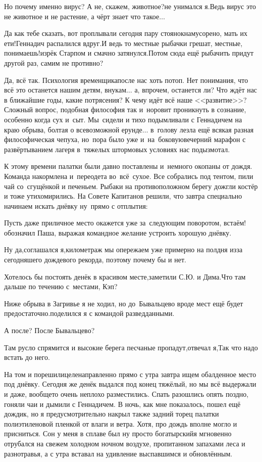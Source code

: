 \diagdash Но почему именно вирус? А не, скажем, животное?\mdash не унимался я.\mdash Ведь вирус это не животное и не растение, а чёрт знает что такое$\ldots$

\diagdash Да как тебе сказать, вот проплывали сегодня пару стоянок\mdash намусорено, мать их ети!\mdash Геннадич распалился вдруг.\mdash И ведь то местные рыбачки грешат, местные, понимаешь!\mdash изрёк Старпом и смачно затянулся.\mdash Потом сюда ещё рыбачить придут другой раз, самим не противно?

Да, всё так. Психология временщика\mdash после нас хоть потоп. Нет понимания, что всё это останется нашим детям, внукам$\ldots$ а, впрочем, останется ли? Что ждёт нас в ближайшие годы, какие потрясения? К чему идёт всё наше <<развитие>>? Сложный вопрос, подобная философия так и~норовит проникнуть в сознание, особенно когда сух и~сыт. Мы~сидели и тихо подымливали с Геннадичем на краю обрыва, болтая о всевозможной ерунде$\ldots$ в~голову лезла ещё всякая разная философическая чепуха, но~пора было уже и~на~боковую\mdash вечерний марафон с развёртыванием лагеря в~тяжелых штормовых условиях нас подызмотал.

К этому времени палатки были давно поставлены и~немного окопаны от дождя. Команда накормлена и~переодета во~всё~сухое. Все собрались под тентом, пили чай со~сгущёнкой и печеньем. Рыбаки на противоположном берегу дожгли костёр и тоже утихомирились. На Совете Капитанов решили, что завтра специально начинаем искать днёвку ну~прямо с отплытия:

\diagdash Пусть даже приличное место окажется уже за~следующим поворотом, встаём!\mdash обозначил Паша, выражая командное желание устроить хорошую днёвку.

\diagdash Ну да,\mdash соглашался я,\mdash километраж мы опережаем уже примерно на полдня из\sdash за сегодняшего дождевого рекорда, поэтому почему бы и нет.

\diagdash Хотелось бы постоять денёк в красивом месте,\mdash заметили С.Ю. и Дима.\mdash Что там дальше по течению с~местами, Кэп? 

\diagdash Ниже обрыва в Загривье я не ходил, но до~Бывальцево вроде мест ещё будет предостаточно.\mdash поделился я с командой разведданными.

\diagdash А после? После Бывальцево?

\diagdash Там русло спрямится и высокие берега песчаные пропадут,\mdash отвечал я,\mdash Так что надо встать до него.

На том и порешили\mdash целенаправленно прямо с утра завтра ищем обалденное место под днёвку. Сегодня же денёк выдался под конец тяжёлый, но мы всё выдержали и даже, вообще\sdash то очень неплохо разместились. Спать разошлись опять поздно, гоняли чаи и дымили с Геннадичем. В ночь, как мне показалось, пошел ещё дождик, но я предусмотрительно накрыл также задний торец палатки полиэтиленовой пленкой от влаги и ветра. Хотя, про дождь вполне могло и присниться. Сон у меня в сплаве был ну просто богатырский\mdash я мгновенно отрубался на свежем холодном ночном воздухе, пропитанном запахами леса и разнотравья, а с утра вставал на удивление выспавшимся и обновлённым.%

\begin{center}
\end{center}
